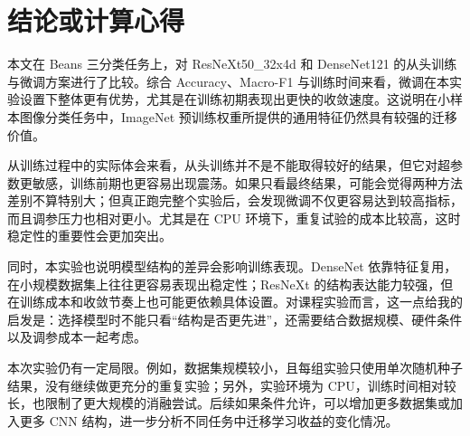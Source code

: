 \section{结论或计算心得}

本文在 Beans 三分类任务上，对 ResNeXt50\_32x4d 和 DenseNet121 的从头训练与微调方案进行了比较。综合 Accuracy、Macro-F1 与训练时间来看，微调在本实验设置下整体更有优势，尤其是在训练初期表现出更快的收敛速度。这说明在小样本图像分类任务中，ImageNet 预训练权重所提供的通用特征仍然具有较强的迁移价值。

从训练过程中的实际体会来看，从头训练并不是不能取得较好的结果，但它对超参数更敏感，训练前期也更容易出现震荡。如果只看最终结果，可能会觉得两种方法差别不算特别大；但真正跑完整个实验后，会发现微调不仅更容易达到较高指标，而且调参压力也相对更小。尤其是在 CPU 环境下，重复试验的成本比较高，这时稳定性的重要性会更加突出。

同时，本实验也说明模型结构的差异会影响训练表现。DenseNet 依靠特征复用，在小规模数据集上往往更容易表现出稳定性；ResNeXt 的结构表达能力较强，但在训练成本和收敛节奏上也可能更依赖具体设置。对课程实验而言，这一点给我的启发是：选择模型时不能只看“结构是否更先进”，还需要结合数据规模、硬件条件以及调参成本一起考虑。

本次实验仍有一定局限。例如，数据集规模较小，且每组实验只使用单次随机种子结果，没有继续做更充分的重复实验；另外，实验环境为 CPU，训练时间相对较长，也限制了更大规模的消融尝试。后续如果条件允许，可以增加更多数据集或加入更多 CNN 结构，进一步分析不同任务中迁移学习收益的变化情况。
